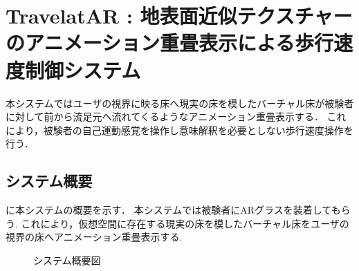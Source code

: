 \chapter{TravelatAR : 地表面近似テクスチャーのアニメーション重畳表示による歩行速度制御システム}
本システムではユーザの視界に映る床へ現実の床を模したバーチャル床が被験者に対して前から流足元へ流れてくるようなアニメーション重畳表示する．
これにより，被験者の自己運動感覚を操作し意味解釈を必要としない歩行速度操作を行う．
\section{システム概要}
に本システムの概要を示す．
本システムでは被験者にARグラスを装着してもらう.
これにより，仮想空間に存在する現実の床を模したバーチャル床をユーザの視界の床へアニメーション重畳表示する.
\begin{figure}[h]
    \centering
    \caption{システム概要図}
    \label{fig:gaiyo}
\end{figure}

